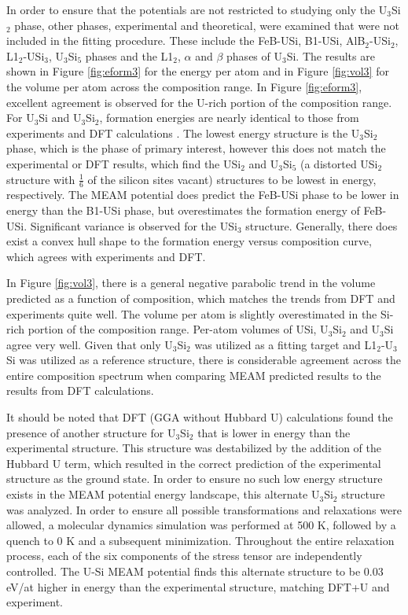 \documentclass[review]{elsarticle}
\begin{document}
In order to ensure that the potentials are not restricted to studying only the U$_{3}$Si$_{2}$ phase, other phases, experimental and theoretical, were examined that were not included in the fitting procedure.  These include the FeB-USi, B1-USi, AlB$_{2}$-USi$_{2}$, L1$_{2}$-USi$_{3}$, U$_{3}$Si$_{5}$ phases and the L1$_{2}$, $\alpha$ and $\beta$ phases of U$_{3}$Si.  The results are shown in Figure \ref{fig:eform3}  for the energy per atom and in Figure \ref{fig:vol3} for the volume per atom across the composition range.  In Figure \ref{fig:eform3}, excellent agreement is observed for the U-rich portion of the composition range.  For U$_{3}$Si and U$_{3}$Si$_{2}$, formation energies are nearly identical to those from experiments \cite{berche2009} and DFT calculations \cite{noordhoek2016}.  The lowest energy structure is the U$_{3}$Si$_{2}$ phase, which is the phase of primary interest, however this does not match the experimental or DFT results, which find the USi$_{2}$ and U$_{3}$Si$_{5}$ (a distorted USi$_{2}$ structure with $\frac{1}{6}$ of the silicon sites vacant) structures to be lowest in energy, respectively.  The MEAM potential does predict the FeB-USi phase to be lower in energy than the B1-USi phase, but overestimates the formation energy of FeB-USi.  Significant variance is observed for the USi$_{3}$ structure.  Generally, there does exist a convex hull shape to the formation energy versus composition curve, which agrees with experiments \cite{berche2009} and DFT.  

In Figure \ref{fig:vol3}, there is a general negative parabolic trend in the volume predicted as a function of composition, which matches the trends from DFT and experiments quite well.  The volume per atom is slightly overestimated in the Si-rich portion of the composition range.  Per-atom volumes of USi, U$_{3}$Si$_{2}$ and U$_{3}$Si agree very well.  Given that only U$_{3}$Si$_{2}$ was utilized as a fitting target and L1$_{2}$-U$_{3}$Si was utilized as a reference structure, there is considerable agreement across the entire composition spectrum when comparing MEAM predicted results to the results from DFT calculations.   

It should be noted that DFT (GGA without Hubbard U) calculations \cite{noordhoek2016} found the presence of another structure for U$_{3}$Si$_{2}$ that is lower in energy than the experimental structure.  This structure was destabilized by the addition of the Hubbard U term, which resulted in the correct prediction of the experimental structure as the ground state.  In order to ensure no such low energy structure exists in the MEAM potential energy landscape, this alternate U$_{3}$Si$_{2}$ structure was analyzed.  In order to ensure all possible transformations and relaxations were allowed, a molecular dynamics simulation was performed at 500 K, followed by a quench to 0 K and a subsequent minimization.  Throughout the entire relaxation process, each of the six components of the stress tensor are independently controlled.  The U-Si MEAM potential finds this alternate structure to be 0.03 eV/at higher in energy than the experimental structure, matching DFT+U and experiment.  
\end{document}

